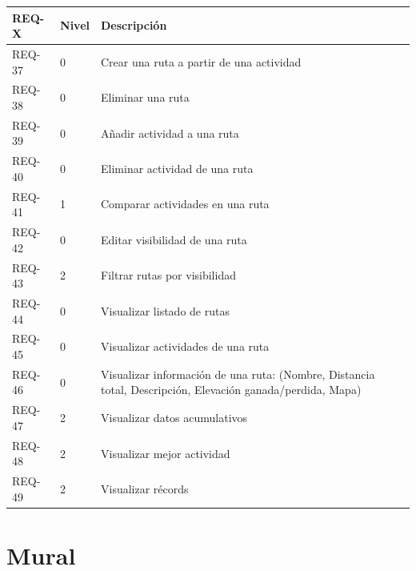 \begin{longtable}{p{2cm} p{1cm} p{11cm}}
\toprule
\textbf{REQ-X} & \textbf{Nivel} & \textbf{Descripción} \\
\midrule
\endhead

REQ-37 & 0 & Crear una ruta a partir de una actividad \\
REQ-38 & 0 & Eliminar una ruta \\
REQ-39 & 0 & Añadir actividad a una ruta \\
REQ-40 & 0 & Eliminar actividad de una ruta \\
REQ-41 & 1 & Comparar actividades en una ruta \\
REQ-42 & 0 & Editar visibilidad de una ruta \\
REQ-43 & 2 & Filtrar rutas por visibilidad \\
REQ-44 & 0 & Visualizar listado de rutas \\
REQ-45 & 0 & Visualizar actividades de una ruta \\
REQ-46 & 0 & Visualizar información de una ruta:
(Nombre, Distancia total, Descripción, Elevación ganada/perdida, Mapa) \\
REQ-47 & 2 & Visualizar datos acumulativos \\
REQ-48 & 2 & Visualizar mejor actividad \\
REQ-49 & 2 & Visualizar récords \\

\bottomrule
\end{longtable}

\section{Mural}

